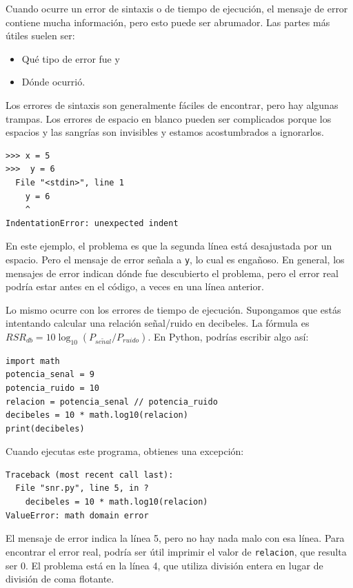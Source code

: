 \documentclass[10pt]{book}
\begin{document}
Cuando ocurre un error de sintaxis o de tiempo de ejecución, el mensaje de error contiene
mucha información, pero esto puede ser abrumador.  Las partes
más útiles suelen ser:

\begin{itemize}

\item Qué tipo de error fue y

\item Dónde ocurrió.

\end{itemize}

Los errores de sintaxis son generalmente fáciles de encontrar, pero hay algunas
trampas.  Los errores de espacio en blanco pueden ser complicados porque los espacios y
las sangrías son invisibles y estamos acostumbrados a ignorarlos.

\begin{verbatim}
>>> x = 5
>>>  y = 6
  File "<stdin>", line 1
    y = 6
    ^
IndentationError: unexpected indent
\end{verbatim}
%
En este ejemplo, el problema es que la segunda línea está desajustada por
un espacio.  Pero el mensaje de error señala a {\tt y}, lo cual es
engañoso.  En general, los mensajes de error indican dónde fue descubierto
el problema, pero el error real podría estar antes en el código,
a veces en una línea anterior. 

Lo mismo ocurre con los errores de tiempo de ejecución. Supongamos que estás intentando
calcular una relación señal/ruido en decibeles.  La fórmula
es $RSR_{db} = 10 \log_{10} (P_{se\tilde{n}al} / P_{ruido})$.  En Python,
podrías escribir algo así:

\begin{verbatim}
import math
potencia_senal = 9
potencia_ruido = 10
relacion = potencia_senal // potencia_ruido
decibeles = 10 * math.log10(relacion)
print(decibeles)
\end{verbatim}
%
Cuando ejecutas este programa, obtienes una excepción:
%

\begin{verbatim}
Traceback (most recent call last):
  File "snr.py", line 5, in ?
    decibeles = 10 * math.log10(relacion)
ValueError: math domain error
\end{verbatim}
%
El mensaje de error indica la línea 5, pero no hay nada
malo con esa línea.  Para encontrar el error real, podría ser
útil imprimir el valor de {\tt relacion}, que resulta
ser 0.  El problema está en la línea 4, que utiliza división entera
en lugar de división de coma flotante.
\end{document}
